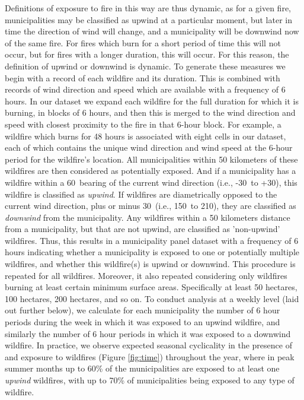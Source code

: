 \documentclass[11pt]{article}
\begin{document}
\begin{spacing}{1.5}
Definitions of exposure to fire in this way are thus dynamic, as for a given fire, municipalities may be classified as upwind at a particular moment, but later in time the direction of wind will change, and a municipality will be downwind now of the same fire.  For fires which burn for a short period of time this will not occur, but for fires with a longer duration, this will occur.  For this reason, the definition of upwind or downwind is dynamic.  To generate these measures we begin with a record of each wildfire and its duration.  This is combined with records of wind direction and speed which are available with a frequency of 6 hours. In our dataset we expand each wildfire for the full duration for which it is burning, in blocks of 6 hours, and then this is merged to the wind direction and speed with closest proximity to the fire in that 6-hour block.  For example, a wildfire which burns for 48 hours is associated with eight cells in our dataset, each of which contains the unique wind direction and wind speed at the 6-hour period for the wildfire's location.  All municipalities within 50 kilometers of these wildfires are then considered as potentially exposed. And if a municipality has a wildfire within a 60\textdegree\ bearing of the current wind direction (i.e., -30\textdegree\ to +30\textdegree), this wildfire is classified as \textit{upwind}.  If wildfires are diametrically opposed to the current wind direction, plus or minus 30\textdegree\ (i.e., 150\textdegree\ to 210\textdegree), they are classified as \textit{downwind} from the municipality.  Any wildfires within a 50 kilometers distance from a municipality,  but that are not upwind, are classified as 'non-upwind' wildfires.  Thus, this results in a municipality panel dataset with a frequency of 6 hours indicating whether a municipality is exposed to one or potentially multiple wildfires, and whether this wildfire(s) is upwind or downwind.  This procedure is repeated for all wildfires. Moreover, it also repeated considering only wildfires burning at least certain minimum surface areas. Specifically at least 50 hectares, 100 hectares, 200 hectares, and so on.  To conduct analysis at a weekly level (laid out further below), we calculate for each municipality the number of 6 hour periods during the week in which it was exposed to an upwind wildfire, and similarly the number of 6 hour periods in which it was exposed to a downwind wildfire.  In practice, we observe expected seasonal cyclicality in the presence of and exposure to wildfires (Figure \ref{fig:time}) throughout the year, where in peak summer months up to 60\% of the municipalities are exposed to at least one \textit{upwind} wildfires, with up to 70\% of municipalities being exposed to any type of wildfire. 



\end{spacing}
\end{document}
